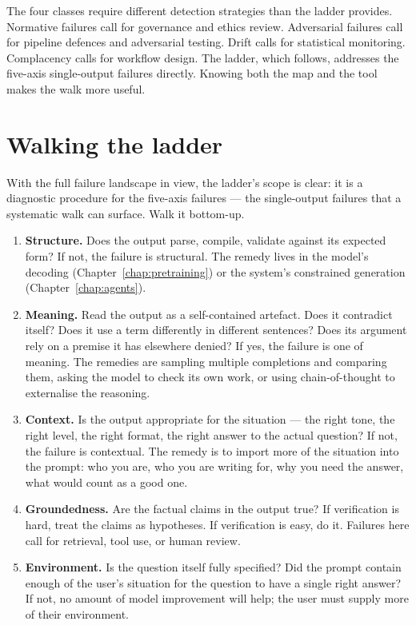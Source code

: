The four classes require different detection strategies than
the ladder provides. Normative failures call for governance
and ethics review. Adversarial failures call for pipeline
defences and adversarial testing. Drift calls for statistical
monitoring. Complacency calls for workflow design. The ladder,
which follows, addresses the five-axis single-output failures
directly. Knowing both the map and the tool makes the walk
more useful.

\section{Walking the ladder}

With the full failure landscape in view, the ladder's scope
is clear: it is a diagnostic procedure for the five-axis
failures --- the single-output failures that a systematic
walk can surface. Walk it bottom-up.

\begin{enumerate}
  \item \textbf{Structure.} Does the output parse, compile,
        validate against its expected form? If not, the
        failure is structural. The remedy lives in the model's
        decoding (Chapter~\ref{chap:pretraining}) or the system's constrained
        generation (Chapter~\ref{chap:agents}).
  \item \textbf{Meaning.} Read the output as a self-contained
        artefact. Does it contradict itself? Does it use a
        term differently in different sentences? Does its
        argument rely on a premise it has elsewhere denied?
        If yes, the failure is one of meaning. The remedies
        are sampling multiple completions and comparing them,
        asking the model to check its own work, or using
        chain-of-thought to externalise the reasoning.
  \item \textbf{Context.} Is the output appropriate for the
        situation --- the right tone, the right level, the
        right format, the right answer to the actual question?
        If not, the failure is contextual. The remedy is to
        import more of the situation into the prompt: who you
        are, who you are writing for, why you need the answer,
        what would count as a good one.
  \item \textbf{Groundedness.} Are the factual claims in the
        output true? If verification is hard, treat the claims
        as hypotheses. If verification is easy, do it.
        Failures here call for retrieval, tool use, or human
        review.
  \item \textbf{Environment.} Is the question itself fully
        specified? Did the prompt contain enough of the user's
        situation for the question to have a single right
        answer? If not, no amount of model improvement will
        help; the user must supply more of their environment.
\end{enumerate}

